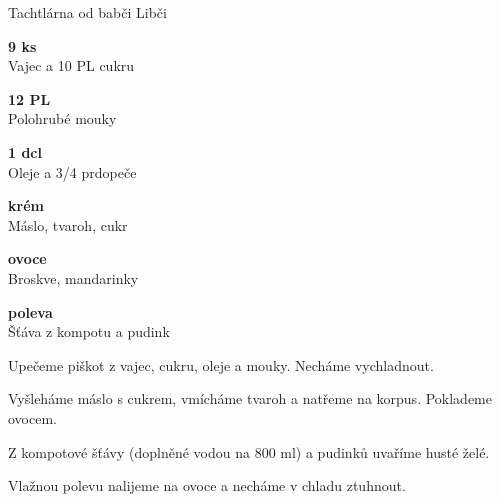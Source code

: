 \documentclass[11pt,a4paper]{article}
\begin{document}
\begin{recipe}[RoyalBlue]{Tachtlárna od babči Libči}
    \begin{ingredients}
        \item \parbox[t]{\linewidth}{\raggedright \piece \textbf{9 ks}\\ Vajec a 10 PL cukru}
        \item \parbox[t]{\linewidth}{\raggedright \weight \textbf{12 PL}\\ Polohrubé mouky}
        \item \parbox[t]{\linewidth}{\raggedright \liquid \textbf{1 dcl}\\ Oleje a 3/4 prdopeče}
        \item \parbox[t]{\linewidth}{\raggedright \piece \textbf{krém}\\ Máslo, tvaroh, cukr}
        \item \parbox[t]{\linewidth}{\raggedright \indefinite \textbf{ovoce}\\ Broskve, mandarinky}
        \item \parbox[t]{\linewidth}{\raggedright \liquid \textbf{poleva}\\ Šťáva z kompotu a pudink}
    \end{ingredients}
    \begin{steps}
        \item Upečeme piškot z vajec, cukru, oleje a mouky. Necháme vychladnout.
        \item Vyšleháme máslo s cukrem, vmícháme tvaroh a natřeme na korpus. Poklademe ovocem.
        \item Z kompotové šťávy (doplněné vodou na 800 ml) a pudinků uvaříme husté želé.
        \item Vlažnou polevu nalijeme na ovoce a necháme v chladu ztuhnout.
    \end{steps}
\end{recipe}
\end{document}
